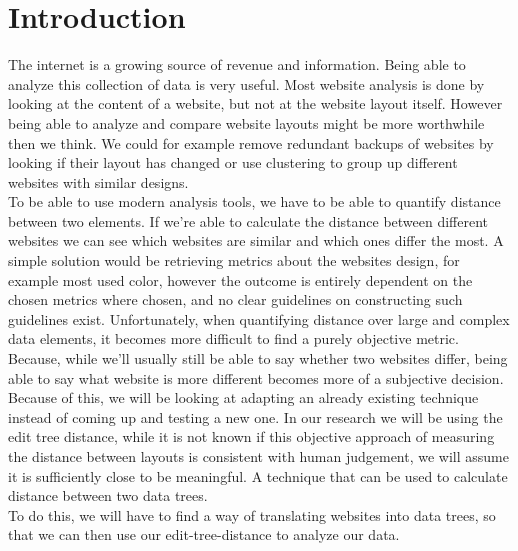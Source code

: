\chapter{Introduction}\label{introduction}
The internet is a growing source of revenue and information. Being able to analyze this collection of data is very useful. Most website analysis is done by looking at the content of a website, but not at the website layout itself. However being able to analyze and compare website layouts might be more worthwhile then we think. We could for example remove redundant backups of websites by looking if their layout has changed or use clustering to group up different websites with similar designs.\\
To be able to use modern analysis tools, we have to be able to quantify distance between two elements. If we're able to calculate the distance between different websites we can see which websites are similar and which ones differ the most. A simple solution would be retrieving metrics about the websites design, for example most used color, however the outcome is entirely dependent on the chosen metrics where chosen, and no clear guidelines on constructing such guidelines exist. Unfortunately, when quantifying distance over large and complex data elements, it becomes more difficult to find a purely objective metric. Because, while we'll usually still be able to say whether two websites differ, being able to say what website is more different becomes more of a subjective decision.\\
Because of this, we will be looking at adapting an already existing technique instead of coming up and testing a new one. In our research we will be using the edit tree distance, while it is not known if this objective approach of measuring the distance between layouts is consistent with human judgement, we will assume it is sufficiently close to be meaningful. A technique that can be used to calculate distance between two data trees.\\
To do this, we will have to find a way of translating websites into data trees, so that we can then use our edit-tree-distance to analyze our data.
